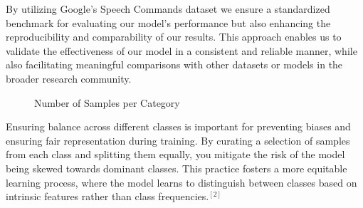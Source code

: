\documentclass[a4paper]{report}
\begin{document}
{By utilizing Google's Speech Commands dataset we ensure a standardized benchmark for evaluating our model's performance but also enhancing the reproducibility and comparability of our results. This approach enables us to validate the effectiveness of our model in a consistent and reliable manner, while also facilitating meaningful comparisons with other datasets or models in the broader research community.
\begin{figure}[H]
    \centering
    \caption{Number of Samples per Category}
    \label{Training Data Distribution}
\end{figure}
Ensuring balance across different classes is important for preventing biases and ensuring fair representation during training. By curating a selection of samples from each class and splitting them equally, you mitigate the risk of the model being skewed towards dominant classes. This practice fosters a more equitable learning process, where the model learns to distinguish between classes based on intrinsic features rather than class frequencies.$^{[2]}$
}
\end{document}
